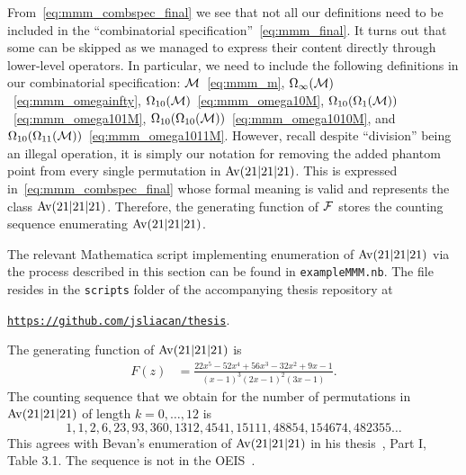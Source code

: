 \documentclass[12pt, a4paper, twoside]{report}
\begin{document}
From~\eqref{eq:mmm_combspec_final} we see that not all our definitions need to be included in the ``combinatorial specification''~\eqref{eq:mmm_final}. It turns out that some can be skipped as we managed to express their content directly through lower-level operators. In particular, we need to include the following definitions in our combinatorial specification: $\mathcal{M}$~\eqref{eq:mmm_m}, $\Omega_\infty(\mathcal{M})$~\eqref{eq:mmm_omegainfty}, $\Omega_{10}(\mathcal{M})$~\eqref{eq:mmm_omega10M}, $\Omega_{10}(\Omega_1(\mathcal{M}))$~\eqref{eq:mmm_omega101M}, $\Omega_{10}(\Omega_{10}(\mathcal{M}))$~\eqref{eq:mmm_omega1010M}, and $\Omega_{10}(\Omega_{11}(\mathcal{M}))$~\eqref{eq:mmm_omega1011M}. However, recall despite ``division'' being an illegal operation, it is simply our notation for removing the added phantom point from every single permutation in $\mathrm{Av}(21|21|21)$. This is expressed in~\eqref{eq:mmm_combspec_final} whose formal meaning is valid and represents the class $\mathrm{Av}(21|21|21)$. Therefore, the generating function of $\mathcal{F}$ stores the counting sequence enumerating $\mathrm{Av}(21|21|21)$.

The relevant Mathematica script implementing enumeration of $\mathrm{Av}(21|21|21)$ via the process described in this section can be found in \texttt{exampleMMM.nb}. The file resides in the \texttt{scripts} folder of the accompanying thesis repository at

\begin{center}\href{https://github.com/jsliacan/thesis}{\texttt{https://github.com/jsliacan/thesis}}.\end{center}

The generating function of $\mathrm{Av}(21|21|21)$ is
\begin{align}
  F(z) &= \frac{22x^5-52x^4+56x^3-32x^2+9x-1}{(x-1)^3(2x-1)^2(3x-1)}.
\end{align}
The counting sequence that we obtain for the number of permutations in $\mathrm{Av}(21|21|21)$ of length $k=0,\ldots,12$ is $$1, 1, 2, 6, 23, 93, 360, 1312, 4541, 15111, 48854, 154674, 482355\ldots$$
This agrees with Bevan's enumeration of $\mathrm{Av}(21|21|21)$ in his thesis~\cite{bevan2015thesis}, Part I, Table 3.1. The sequence is not in the OEIS~\cite{oeis}.
\end{document}
